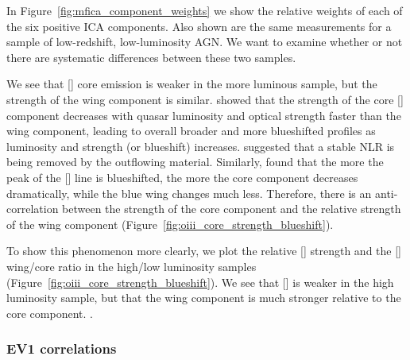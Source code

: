 In Figure~\ref{fig:mfica_component_weights} we show the relative weights of each of the six positive \ac{ICA} components. 
Also shown are the same measurements for a sample of low-redshift, low-luminosity AGN. 
We want to examine whether or not there are systematic differences between these two samples. 

We see that [] core emission is weaker in the more luminous sample, but the strength of the wing component is similar. 
\citet{shen14} showed that the strength of the core [] component decreases with quasar luminosity and optical  strength faster than the wing component, leading to overall broader and more blueshifted profiles as luminosity and  strength (or  blueshift) increases. 
\citet{shen14} suggested that a stable \ac{NLR} is being removed by the outflowing material. 
Similarly, \citet{zhang11} found that the more the peak of the [] line is blueshifted, the more the core component decreases dramatically, while the blue wing changes much less. 
Therefore, there is an anti-correlation between the strength of the core component and the relative strength of the wing component (Figure~\ref{fig:oiii_core_strength_blueshift}). 

To show this phenomenon more clearly, we plot the relative [] strength and the [] wing/core ratio in the high/low luminosity samples (Figure~\ref{fig:oiii_core_strength_blueshift}). 
We see that [] is weaker in the high luminosity sample, but that the wing component is much stronger relative to the core component. 
. 

\subsubsection{\ac{EV1} correlations}

